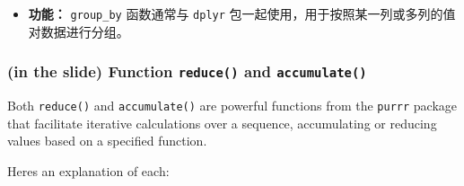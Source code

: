\documentclass[
]{article}
\begin{document}
\begin{itemize}
\item
  \textbf{功能：} \texttt{group\_by} 函数通常与 \texttt{dplyr}
  包一起使用，用于按照某一列或多列的值对数据进行分组。
\end{itemize}

\hypertarget{in-the-slide-function-reduce-and-accumulate}{%
\subsubsection{\texorpdfstring{(in the slide) Function \texttt{reduce()}
and
\texttt{accumulate()}}{(in the slide) Function reduce() and accumulate()}}\label{in-the-slide-function-reduce-and-accumulate}}

Both \texttt{reduce()} and \texttt{accumulate()} are powerful functions
from the \texttt{purrr} package that facilitate iterative calculations
over a sequence, accumulating or reducing values based on a specified
function.

Here\textquotesingle s an explanation of each:
\end{document}
